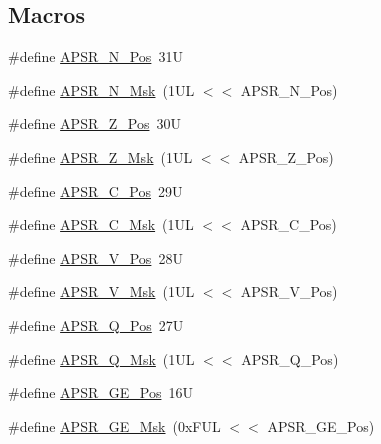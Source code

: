\subsection*{Macros}
\begin{DoxyCompactItemize}
\item 
\#define \mbox{\hyperlink{group___c_m_s_i_s___c_o_r_e_gac469528d210043c7bd3f12f0e6824766}{A\+P\+S\+R\+\_\+\+N\+\_\+\+Pos}}~31U
\item 
\#define \mbox{\hyperlink{group___c_m_s_i_s___c_o_r_e_gadbc2cf55a026f661b53fadfcf822cef1}{A\+P\+S\+R\+\_\+\+N\+\_\+\+Msk}}~(1\+U\+L $<$$<$ A\+P\+S\+R\+\_\+\+N\+\_\+\+Pos)
\item 
\#define \mbox{\hyperlink{group___c_m_s_i_s___c_o_r_e_ga3661286d108b1aca308d7445685eae3a}{A\+P\+S\+R\+\_\+\+Z\+\_\+\+Pos}}~30U
\item 
\#define \mbox{\hyperlink{group___c_m_s_i_s___c_o_r_e_ga1deb4d1aa72bb83d1f79329406f15711}{A\+P\+S\+R\+\_\+\+Z\+\_\+\+Msk}}~(1\+U\+L $<$$<$ A\+P\+S\+R\+\_\+\+Z\+\_\+\+Pos)
\item 
\#define \mbox{\hyperlink{group___c_m_s_i_s___c_o_r_e_ga6cf72aa6f09a168f9e5beda1a4a887b9}{A\+P\+S\+R\+\_\+\+C\+\_\+\+Pos}}~29U
\item 
\#define \mbox{\hyperlink{group___c_m_s_i_s___c_o_r_e_ga6d47803fbad455bc10bd1ce59f2f335d}{A\+P\+S\+R\+\_\+\+C\+\_\+\+Msk}}~(1\+U\+L $<$$<$ A\+P\+S\+R\+\_\+\+C\+\_\+\+Pos)
\item 
\#define \mbox{\hyperlink{group___c_m_s_i_s___c_o_r_e_gac62830f67679ccd11658c4172c3e6ea7}{A\+P\+S\+R\+\_\+\+V\+\_\+\+Pos}}~28U
\item 
\#define \mbox{\hyperlink{group___c_m_s_i_s___c_o_r_e_ga33305d6701356bff6890b315fe8b5489}{A\+P\+S\+R\+\_\+\+V\+\_\+\+Msk}}~(1\+U\+L $<$$<$ A\+P\+S\+R\+\_\+\+V\+\_\+\+Pos)
\item 
\#define \mbox{\hyperlink{group___c_m_s_i_s___c_o_r_e_ga298749e176f12827328bb7b92a6b2411}{A\+P\+S\+R\+\_\+\+Q\+\_\+\+Pos}}~27U
\item 
\#define \mbox{\hyperlink{group___c_m_s_i_s___c_o_r_e_ga90ffd4ec4149c2f5dd7747c1533fb002}{A\+P\+S\+R\+\_\+\+Q\+\_\+\+Msk}}~(1\+U\+L $<$$<$ A\+P\+S\+R\+\_\+\+Q\+\_\+\+Pos)
\item 
\#define \mbox{\hyperlink{group___c_m_s_i_s___c_o_r_e_ga722cb42b5c75af3e8909fac6fd40dfdc}{A\+P\+S\+R\+\_\+\+G\+E\+\_\+\+Pos}}~16U
\item 
\#define \mbox{\hyperlink{group___c_m_s_i_s___c_o_r_e_ga8a3ecbc0ea2029462b0f4ce50e227db1}{A\+P\+S\+R\+\_\+\+G\+E\+\_\+\+Msk}}~(0x\+F\+U\+L $<$$<$ A\+P\+S\+R\+\_\+\+G\+E\+\_\+\+Pos)

\end{DoxyCompactItemize}
